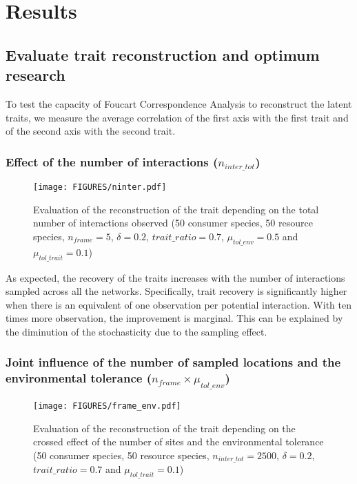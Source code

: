 \section{Results}

\subsection{Evaluate trait reconstruction and optimum research}

To test the capacity of Foucart Correspondence Analysis to reconstruct the latent traits, we measure the average correlation of the first axis with the first trait and of the second axis with the second trait.

\subsubsection{Effect of the number of interactions ($n_{inter\_tot}$)}

\begin{figure}[H]
    \centering
    \texttt{[image: FIGURES/ninter.pdf]}
    \caption{Evaluation of the reconstruction of the trait depending on the total number of interactions observed (50 consumer species, 50 resource species, $n_{frame} = 5$, $\delta =  0.2$, $trait\_ratio = 0.7$, $\mu_{tol\_env} = 0.5$ and $\mu_{tol\_trait} = 0.1$)}
    \label{fig:ninter}
\end{figure}

As expected, the recovery of the traits increases with the number of interactions sampled across all the networks. Specifically, trait recovery is significantly higher when there is an equivalent of one observation per potential interaction. With ten times more observation, the improvement is marginal. This can be explained by the diminution of the stochasticity due to the sampling effect.


\subsubsection{Joint influence of the number of sampled locations and the environmental tolerance ($n_{frame} \times \mu_{tol\_env}$)}

\begin{figure}[H]
    \centering
    \texttt{[image: FIGURES/frame\_env.pdf]}
    \caption{Evaluation of the reconstruction of the trait depending on the crossed effect of the number of sites and the environmental tolerance (50 consumer species, 50 resource species, $n_{inter\_tot} = 2500$, $\delta =  0.2$, $trait\_ratio = 0.7$ and $\mu_{tol\_trait} = 0.1$)}
    \label{fig:frame_env}
\end{figure}

